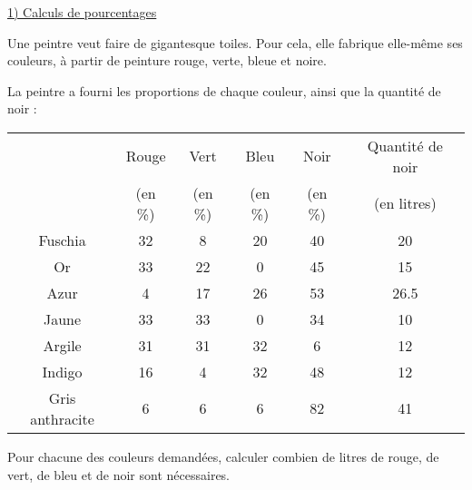 \documentclass[a4paper]{article}
\begin{document}

{\large\uline{1) Calculs de pourcentages}}

Une peintre veut faire de gigantesque toiles. Pour cela, elle fabrique elle-même ses couleurs, à partir de peinture rouge, verte, bleue et noire.

La peintre a fourni les proportions de chaque couleur, ainsi que la quantité de noir :

\begin{center}
	\begin{tabular}{|c|c|c|c|c||c|}
		\hline
		                & Rouge   & Vert    & Bleu    & Noir    & Quantité de noir \\
		                & (en \%) & (en \%) & (en \%) & (en \%) & (en litres)      \\ \hline
		Fuschia         & 32      & 8       & 20      & 40      & 20               \\ \hline
		Or              & 33      & 22      & 0       & 45      & 15               \\ \hline
		Azur            & 4       & 17      & 26      & 53      & 26.5             \\ \hline
		Jaune           & 33      & 33      & 0       & 34      & 10               \\ \hline
		Argile          & 31      & 31      & 32      & 6       & 12               \\ \hline
		Indigo          & 16      & 4       & 32      & 48      & 12               \\ \hline
		Gris anthracite & 6       & 6       & 6       & 82      & 41               \\ \hline
	\end{tabular}
\end{center}

Pour chacune des couleurs demandées, calculer combien de litres de rouge, de vert, de bleu et de noir sont nécessaires.

\vspace{2em}
\end{document}

